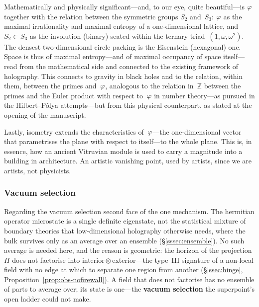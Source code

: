 Mathematically and physically significant---and, to our eye, quite
beautiful---is $\varphi$ together with the relation between the symmetric
groups $S_2$ and~$S_3$: $\varphi$ as the
maximal irrationality and maximal entropy of a one-dimensional lattice,
and $S_2\subset S_3$ as the involution (binary) seated within the ternary
triad~$(1,\omega,\omega^{2})$. The densest two-dimensional circle packing
is the Eisenstein (hexagonal) one. Space is thus of maximal entropy---and
of maximal occupancy of space itself---read from the mathematical side and
connected to the existing framework of holography. This connects to
gravity in black holes and to the relation, within them, between the
primes and~$\varphi$, analogous to the relation in~$\mathbb{Z}$ between the
primes and the Euler product with respect to~$\varphi$ in number
theory---as pursued in the Hilbert--P\'olya attempts---but from this
physical counterpart, as stated at the opening of the manuscript.

Lastly, isometry extends the characteristics
of~$\varphi$---the one-dimensional vector that parametrises the plane with
respect to itself---to the whole plane. This is, in essence, how an
ancient Vitruvian module is used to carry a magnitude into a building in
architecture. An artistic vanishing point,
used by artists, since we are artists, not physicists.


\subsubsection{Vacuum selection}\label{sssec:disc-vacuum}

Regarding the vacuum selection second face of the one mechanism. The hermitian operator microstate is a single definite eigenstate, not the statistical mixture of boundary theories that low-dimensional holography otherwise needs, where the bulk survives only as an average over an ensemble (\S\ref{sssec:ensemble}). No such average is needed here, and the reason is geometric: the horizon of the projection $\Pi$ does not factorise into interior${}\otimes{}$exterior---the type~III signature of a non-local field with no edge at which to separate one region from another (\S\ref{ssec:hinge}, Proposition~\ref{prop:obs-nofirewall}). A field that does not factorise has no ensemble of parts to average over; its state is one---the \textbf{vacuum selection} the superpoint's open ladder could not make.

